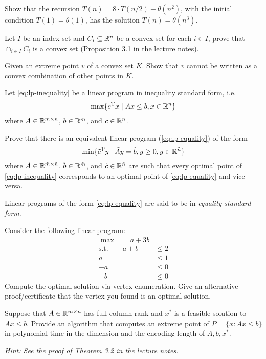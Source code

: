 \documentclass[11pt]{article}
\institute{\'Ecole Polytechnique F\'ed\'erale de Lausanne}
\begin{document}
\makeheader

\problem
Show that the recursion 
$T(n) = 8 \cdot T(n/2) + \theta(n^2)$, with the initial condition $T(1)=\theta(1)$,
has the solution $T(n) = \theta(n^3)$. 

\problem
Let $I$ be an index set and $C_i \subseteq \mathbb{R}^n$ be a convex set for each $i \in I$, prove that $\cap_{i \in I}C_i$ is a convex set (Proposition 3.1 in the lecture notes). 

\problem
Given an extreme point $v$ of a convex set $K$. Show that $v$ cannot be written as a convex combination of
other points in $K$.

\problem 
Let \eqref{eq:lp-inequality} be a linear program in inequality standard form, i.e.
\begin{align} \label{eq:lp-inequality}
\max\{ c^{\textnormal{T}} x \mid Ax \le b, x \in \mathbb{R}^n \}
\end{align}
where $A \in \mathbb{R}^{m \times n}$, $b\in \mathbb{R}^m$, and $c\in\mathbb{R}^n$.

Prove that there is an equivalent linear program (\ref{eq:lp-equality}) of the form
\begin{align} \label{eq:lp-equality}
\min\{ \tilde c^{\textnormal{T}} y \mid \tilde Ay = \tilde b, y \ge 0, y \in \mathbb{R}^{\tilde n} \}
\end{align}
where $\tilde A \in \mathbb{R}^{\tilde m \times \tilde n}$, $\tilde b \in \mathbb{R}^{\tilde m}$, and $\tilde c \in \mathbb{R}^{\tilde n}$
are such that every optimal point of \eqref{eq:lp-inequality} corresponds to an optimal point of \eqref{eq:lp-equality}
and vice versa.

Linear programs of the form \eqref{eq:lp-equality} are said to be in \emph{equality standard form}.

\problem
Consider the following linear program:
\begin{align*}
	\max \qquad a + 3b \\
	\text{s.t.} \qquad a + b &\le 2 \\
	  a &\le 1 \\
		-a &\le 0 \\
		-b &\le 0
\end{align*}
Compute the optimal solution via vertex enumeration. Give an alternative proof/certificate that the vertex you found is an optimal solution.

\problemstar
Suppose that $A\in \mathbb{R}^{m\times n}$ has full-column rank and $x^*$ is a feasible solution to $Ax \leq b$. Provide an algorithm that computes an extreme point of $P = \{x : Ax \leq b\}$ in polynomial time in the dimension and the encoding length of $A,b,x^*$.

\smallskip

\textit{Hint: See the proof of Theorem 3.2 in the lecture notes.}
\end{document}
